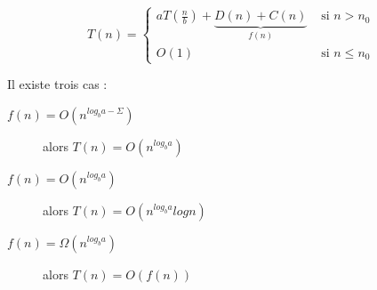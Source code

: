 $$T(n) = \left\{\begin{array}{ll}
aT(\frac{n}{b}) + \underbrace{D(n) + C(n)}_{f(n)} & \mbox{ si $n > n_0$}\\
O(1) & \mbox{ si $n \le n_0$}
\end{array}\right.$$

Il existe trois cas :
\begin{description}
  \item[$f(n) = O(n^{log_ba - \Sigma})$] alors $T(n) = O(n^{log_ba})$
  \item[$f(n) = O(n^{log_ba})$] alors $T(n) = O(n^{log_ba}log n)$
  \item[$f(n) = \Omega(n^{log_ba})$] alors $T(n) = O(f(n))$
\end{description}
